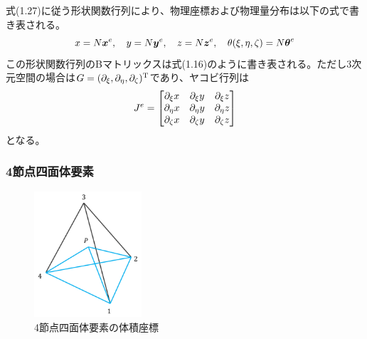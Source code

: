 \documentclass[dvipdfmx, 9pt, a4paper]{jsarticle}
\numberwithin{equation}{section}
\newcommand{\bm}[1]{{\mbox{\boldmath $#1$}}}
\begin{document}
式(1.27)に従う形状関数行列により、物理座標および物理量分布は以下の式で書き表される。
\begin{equation}
x = N\bm x^e,~~~y = N\bm y^e,~~~z = N\bm z^e,~~~\theta(\xi, \eta, \zeta) = N\bm \theta^e
\end{equation}
この形状関数行列のBマトリックスは式(1.16)のように書き表される。ただし3次元空間の場合は$G=(\partial_\xi, \partial_\eta, \partial_\zeta)^{\rm T}$であり、ヤコビ行列は
\begin{equation}
J^e=
\begin{bmatrix}
\partial_\xi x & \partial_\xi y & \partial_\xi z \\
\partial_\eta x & \partial_\eta y & \partial_\eta z \\
\partial_\zeta x & \partial_\zeta y & \partial_\zeta z \\
\end{bmatrix} \notag
\end{equation}
となる。

\subsubsection{4節点四面体要素}
\begin{figure}[b]
\begin{center}
\includegraphics[width = 4cm]{fig1_8.png}
\caption{4節点四面体要素の体積座標}
\end{center}
\end{figure}
\end{document}
